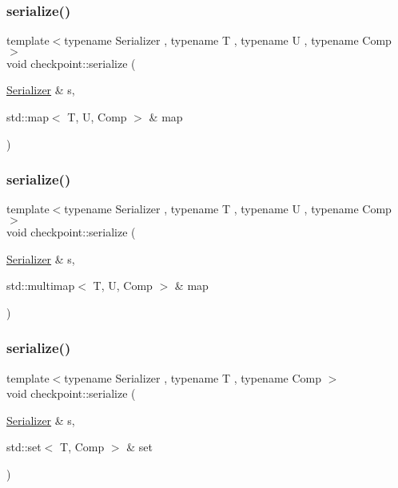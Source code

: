 \subsubsection{\texorpdfstring{serialize()}{serialize()}\hspace{0.1cm}{\footnotesize\ttfamily [16/29]}}
{\footnotesize\ttfamily template$<$typename Serializer , typename T , typename U , typename Comp $>$ \\
void checkpoint\+::serialize (\begin{DoxyParamCaption}\item[{\hyperlink{structcheckpoint_1_1_serializer}{Serializer} \&}]{s,  }\item[{std\+::map$<$ T, U, Comp $>$ \&}]{map }\end{DoxyParamCaption})\hspace{0.3cm}{\ttfamily [inline]}}

\mbox{\label{namespacecheckpoint_a44434f578fc304afa3a62a9305be2a65}} 
\subsubsection{\texorpdfstring{serialize()}{serialize()}\hspace{0.1cm}{\footnotesize\ttfamily [17/29]}}
{\footnotesize\ttfamily template$<$typename Serializer , typename T , typename U , typename Comp $>$ \\
void checkpoint\+::serialize (\begin{DoxyParamCaption}\item[{\hyperlink{structcheckpoint_1_1_serializer}{Serializer} \&}]{s,  }\item[{std\+::multimap$<$ T, U, Comp $>$ \&}]{map }\end{DoxyParamCaption})\hspace{0.3cm}{\ttfamily [inline]}}

\mbox{\label{namespacecheckpoint_a9f1869781f4cce4db94c144174680b24}} 
\subsubsection{\texorpdfstring{serialize()}{serialize()}\hspace{0.1cm}{\footnotesize\ttfamily [18/29]}}
{\footnotesize\ttfamily template$<$typename Serializer , typename T , typename Comp $>$ \\
void checkpoint\+::serialize (\begin{DoxyParamCaption}\item[{\hyperlink{structcheckpoint_1_1_serializer}{Serializer} \&}]{s,  }\item[{std\+::set$<$ T, Comp $>$ \&}]{set }\end{DoxyParamCaption})\hspace{0.3cm}{\ttfamily [inline]}}

